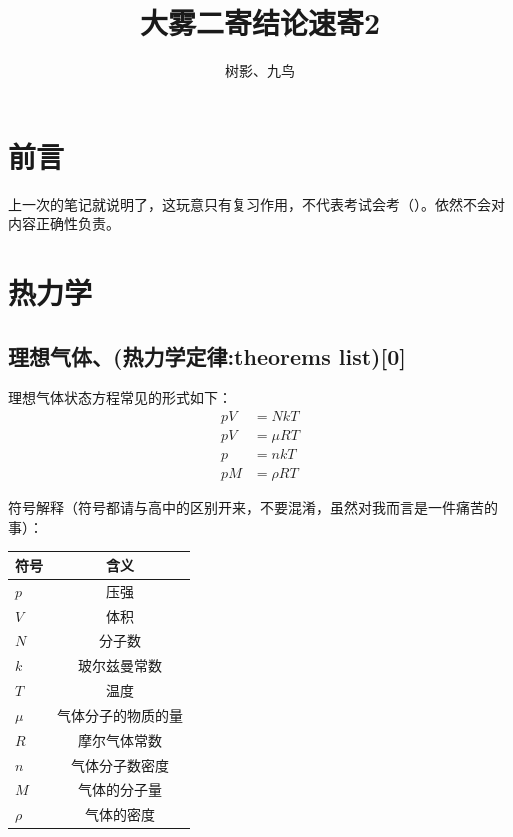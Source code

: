 \documentclass[10pt]{ctexart}
\author{树影、九鸟}
\title{大雾二寄结论速寄2}
\date{}
\begin{document}
\maketitle
\newpage
\tableofcontents
\newpage
\section*{前言}

上一次的笔记就说明了，这玩意只有复习作用，不代表考试会考（）。依然不会对内容正确性负责。

\section{热力学}
\label{sec:热力学}

\subsection{理想气体、(热力学定律:theorems list)[0]}
\label{subsec:理想气体、(热力学定律:theorems list)[0]}

理想气体状态方程常见的形式如下：
\begin{align*}
    p V &= N k T \\
    p V &= \mu R T \\
    p &= n k T \\
    p M &= \rho R T
\end{align*}

符号解释（符号都请与高中的区别开来，不要混淆，虽然对我而言是一件痛苦的事）：

\begin{table}[H]
    \centering
    \begin{tabular}{l|c}
        符号 & 含义 \\
        \hline
        $p$ & 压强 \\
        $V$ & 体积 \\
        $N$ & 分子数 \\
        $k$ & 玻尔兹曼常数 \\
        $T$ & 温度 \\
        $\mu$ & 气体分子的物质的量 \\
        $R$ & 摩尔气体常数 \\
        $n$ & 气体分子数密度 \\
        $M$ & 气体的分子量 \\
        $\rho$ & 气体的密度
    \end{tabular}
\end{table}
\end{document}
